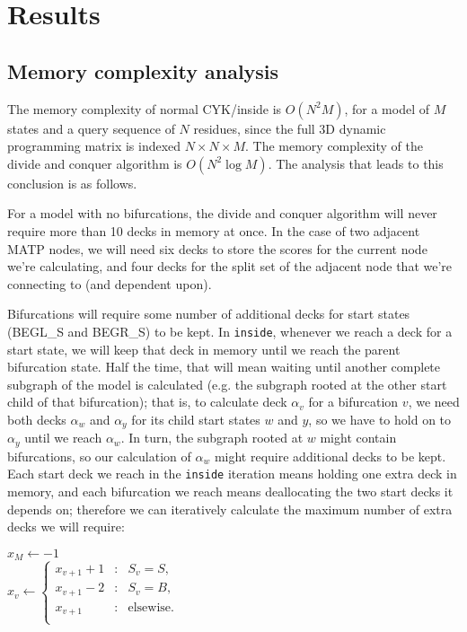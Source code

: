 \documentclass[11pt]{article}
\begin{document}

\section{Results}

\subsection{Memory complexity analysis}

The memory complexity of normal CYK/inside is $O(N^2M)$, for a model
of $M$ states and a query sequence of $N$ residues, since the full 3D
dynamic programming matrix is indexed $N \times N \times M$. The
memory complexity of the divide and conquer algorithm is $O(N^2 \log
M)$. The analysis that leads to this conclusion is as follows.

For a model with no bifurcations, the divide and conquer algorithm
will never require more than 10 decks in memory at once. In the case
of two adjacent MATP nodes, we will need six decks to store the scores
for the current node we're calculating, and four decks for the split
set of the adjacent node that we're connecting to (and dependent
upon).

Bifurcations will require some number of additional decks for start
states (BEGL\_S and BEGR\_S) to be kept. In \texttt{inside}, whenever
we reach a deck for a start state, we will keep that deck in memory
until we reach the parent bifurcation state. Half the time, that will
mean waiting until another complete subgraph of the model is
calculated (e.g. the subgraph rooted at the other start child of that
bifurcation); that is, to calculate deck $\alpha_v$ for a bifurcation
$v$, we need both decks $\alpha_w$ and $\alpha_y$ for its child start
states $w$ and $y$, so we have to hold on to $\alpha_y$ until we reach
$\alpha_w$. In turn, the subgraph rooted at $w$ might contain
bifurcations, so our calculation of $\alpha_w$ might require
additional decks to be kept. Each start deck we reach in the
\texttt{inside} iteration means holding one extra deck in memory, and
each bifurcation we reach means deallocating the two start decks it
depends on; therefore we can iteratively calculate the maximum number
of extra decks we will require:

\begin{algorithm}
\begin{algtab*}
  $x_M \leftarrow -1$\\
     $x_v \leftarrow \left\{ 
       \begin{array}{rcl} 
        x_{v+1} + 1 &:& S_v = S,\\
        x_{v+1} - 2 &:& S_v = B,\\
        x_{v+1}     &:& \mbox{elsewise.}\\
       \end{array} \right.$\\
  \\
\end{algtab*}
\end{algorithm}
\end{document}
